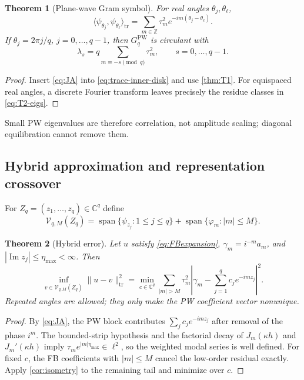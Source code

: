 \documentclass[11pt]{article}
\newtheorem{theorem}{Theorem}[section]
\newcommand{\ii}{i}
\newcommand{\C}{\mathbb{C}}
\newcommand{\trnorm}[1]{\lVert #1\rVert_{\mathrm{tr}}}
\newcommand{\PW}{\mathrm{PW}}
\DeclareMathOperator{\spanop}{span}
\renewcommand{\Im}{\operatorname{Im}}
\numberwithin{equation}{section}
\begin{document}
\begin{theorem}[Plane-wave Gram symbol]\label{thm:T2}
For real angles $\theta_j,\theta_\ell$,
\begin{equation}\label{eq:T2-Gram}
 \langle\psi_{\theta_j},\psi_{\theta_\ell}\rangle_{\mathrm{tr}}
 =\sum_{m\in\mathbb Z}\tau_m^2e^{-\ii m(\theta_j-\theta_\ell)}.
\end{equation}
If $\theta_j=2\pi j/q$, $j=0,\ldots,q-1$, then $G_q^{\PW}$ is circulant with
\begin{equation}\label{eq:T2-eigs}
 \lambda_s=q\sum_{m\equiv -s\pmod q}\tau_m^2,
 \qquad s=0,\ldots,q-1.
\end{equation}
\end{theorem}
\begin{proof}
Insert \eqref{eq:JA} into \eqref{eq:trace-inner-disk} and use \cref{thm:T1}.  For equispaced real angles, a discrete Fourier transform leaves precisely the residue classes in \eqref{eq:T2-eigs}.
\end{proof}
Small PW eigenvalues are therefore correlation, not amplitude scaling; diagonal equilibration cannot remove them.

\subsection{Hybrid approximation and representation crossover}
For $Z_q=(z_1,\ldots,z_q)\in\C^q$ define
\begin{equation}\label{eq:hybrid-space-new}
 \mathcal V_{q,M}(Z_q)=\spanop\{\psi_{z_j}:1\le j\le q\}
 +\spanop\{\varphi_m:|m|\le M\}.
\end{equation}

\begin{theorem}[Hybrid error]\label{thm:T3}
Let $u$ satisfy \eqref{eq:FBexpansion}, $\gamma_m=\ii^{-m}a_m$, and $|\Im z_j|\le\eta_{\max}<\infty$.  Then
\begin{equation}\label{eq:T3}
 \inf_{v\in\mathcal V_{q,M}(Z_q)}\trnorm{u-v}^2
 =\min_{c\in\C^q}\sum_{|m|>M}\tau_m^2
 \left|\gamma_m-\sum_{j=1}^qc_je^{-\ii mz_j}\right|^2.
\end{equation}
Repeated angles are allowed; they only make the PW coefficient vector nonunique.
\end{theorem}
\begin{proof}
By \eqref{eq:JA}, the PW block contributes $\sum_jc_je^{-\ii mz_j}$ after removal of the phase $\ii^m$.  The bounded-strip hypothesis and the factorial decay of $J_m(\kappa h)$ and $J_m'(\kappa h)$ imply $\tau_m e^{|m|\eta_{\max}}\in\ell^2$, so the weighted modal series is well defined.  For fixed $c$, the FB coefficients with $|m|\le M$ cancel the low-order residual exactly.  Apply \cref{cor:isometry} to the remaining tail and minimize over $c$.
\end{proof}
\end{document}
